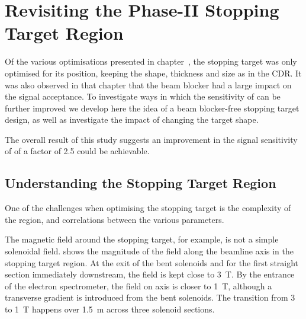 
\chapter{Revisiting the Phase-II Stopping Target Region}
Of the various optimisations presented in chapter~, the stopping target was only optimised for its position, keeping the shape, thickness and size as in the CDR.
It was also observed in that chapter that the beam blocker had a large impact on the signal acceptance.
To investigate ways in which the sensitivity of \phaseII can be further improved we develop here the idea of a beam blocker-free stopping target design, as well as investigate the impact of changing the target shape.

The overall result of this study suggests an improvement in the signal sensitivity of \phaseII of a factor of 2.5 could be achievable.

\section{Understanding the Stopping Target Region}
\FigTgtImprovFieldVsBeamline
\FigTgtImprovMirrorVsBeamline
\FigTgtImprovGyroradiusVsBeamline
\FigTgtImprovSenseVsBeamline
One of the challenges when optimising the stopping target is the complexity of the region, and correlations between the various parameters.

The magnetic field around the stopping target, for example, is not a simple solenoidal field.
 shows the magnitude of the field along the beamline axis in the stopping target region.
At the exit of the bent solenoids and for the first straight section immediately downstream, the field is kept close to 3~T.
By the entrance of the electron spectrometer, the field on axis is closer to 1~T, although a transverse gradient is introduced from the bent solenoids.
The transition from 3 to 1~T happens over 1.5~m across three solenoid sections.


